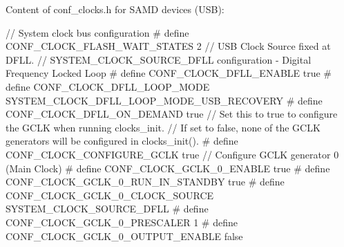Content of conf\-\_\-clocks.\-h for S\-A\-M\-D devices (U\-S\-B)\-: 
\begin{DoxyCode}
        \textcolor{comment}{// System clock bus configuration}
\textcolor{preprocessor}{        #  define CONF\_CLOCK\_FLASH\_WAIT\_STATES            2}
\textcolor{preprocessor}{}
        \textcolor{comment}{// USB Clock Source fixed at DFLL.}
        \textcolor{comment}{// SYSTEM\_CLOCK\_SOURCE\_DFLL configuration - Digital Frequency Locked
       Loop}
\textcolor{preprocessor}{        #  define CONF\_CLOCK\_DFLL\_ENABLE                  true}
\textcolor{preprocessor}{}\textcolor{preprocessor}{        #  define CONF\_CLOCK\_DFLL\_LOOP\_MODE              
       SYSTEM\_CLOCK\_DFLL\_LOOP\_MODE\_USB\_RECOVERY}
\textcolor{preprocessor}{}\textcolor{preprocessor}{        #  define CONF\_CLOCK\_DFLL\_ON\_DEMAND               true}
\textcolor{preprocessor}{}
        \textcolor{comment}{// Set this to true to configure the GCLK when running clocks\_init. }
        \textcolor{comment}{// If set to false, none of the GCLK generators will be configured in
       clocks\_init().}
\textcolor{preprocessor}{        #  define CONF\_CLOCK\_CONFIGURE\_GCLK               true}
\textcolor{preprocessor}{}
        \textcolor{comment}{// Configure GCLK generator 0 (Main Clock)}
\textcolor{preprocessor}{        #  define CONF\_CLOCK\_GCLK\_0\_ENABLE                true}
\textcolor{preprocessor}{}\textcolor{preprocessor}{        #  define CONF\_CLOCK\_GCLK\_0\_RUN\_IN\_STANDBY        true}
\textcolor{preprocessor}{}\textcolor{preprocessor}{        #  define CONF\_CLOCK\_GCLK\_0\_CLOCK\_SOURCE         
       SYSTEM\_CLOCK\_SOURCE\_DFLL}
\textcolor{preprocessor}{}\textcolor{preprocessor}{        #  define CONF\_CLOCK\_GCLK\_0\_PRESCALER             1}
\textcolor{preprocessor}{        #  define CONF\_CLOCK\_GCLK\_0\_OUTPUT\_ENABLE         false}
\end{DoxyCode}
 